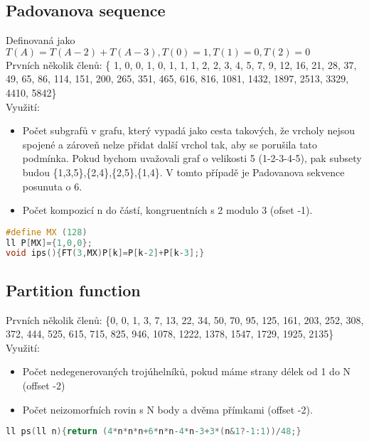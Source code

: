 \documentclass[11pt]{article}
\begin{document}
\subsection{Padovanova sequence}
Definovaná jako $T(A)=T(A-2)+T(A-3), T(0)=1,T(1)=0,T(2)=0$
\\Prvních několik členů: \{	1, 0, 0, 1, 0, 1, 1, 1, 2, 2, 3, 4, 5, 7, 9, 12, 16, 21, 28, 37, 49, 65, 86, 114, 151, 200, 265, 351, 465, 616, 816, 1081, 1432, 1897, 2513, 3329, 4410, 5842\}
\\Využití:
\begin{itemize}
\item Počet subgrafů v grafu, který vypadá jako cesta takových, že vrcholy nejsou spojené a zároveň nelze přidat další vrchol tak, aby se porušila tato podmínka. Pokud bychom uvažovali graf o velikosti 5 (1-2-3-4-5), pak subsety budou \{1,3,5\},\{2,4\},\{2,5\},\{1,4\}. V tomto případě je Padovanova sekvence posunuta o 6.
\item Počet kompozicí \textsf{n} do částí, kongruentních s 2 modulo 3 (ofset -1).
\end{itemize}
\begin{lstlisting}[language=C++]
#define MX (128)
ll P[MX]={1,0,0};
void ips(){FT(3,MX)P[k]=P[k-2]+P[k-3];}
\end{lstlisting}
\subsection{Partition function}
Prvních několik členů: \{0, 0, 1, 3, 7, 13, 22, 34, 50, 70, 95, 125, 161, 203, 252, 308, 372, 444, 525, 615, 715, 825, 946, 1078, 1222, 1378, 1547, 1729, 1925, 2135\}
\\Využití:
\begin{itemize}
\item Počet nedegenerovaných trojúhelníků, pokud máme strany délek od 1 do \textsf{N} (offset -2)
\item Počet neizomorfních rovin s \textsf{N} body a dvěma přímkami (offset -2).
\end{itemize}
\begin{lstlisting}[language=C++]
ll ps(ll n){return (4*n*n*n+6*n*n-4*n-3+3*(n&1?-1:1))/48;}
\end{lstlisting}
\end{document}
